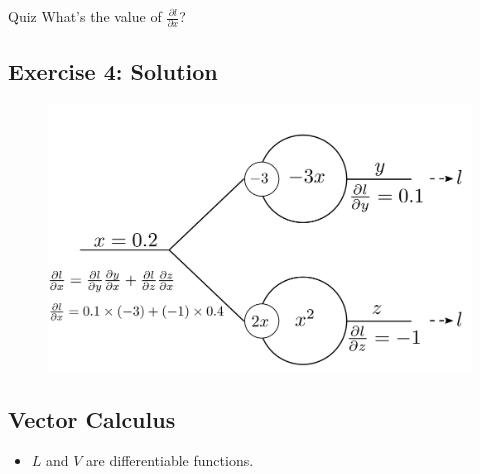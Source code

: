 \documentclass{book}
\begin{document}
\begin{myblock}{Quiz}
What's the value of $\frac{\partial l}{\partial x}$?
\end{myblock}

\subsection{Exercise 4: Solution}

\begin{figure}[h]
    \centering
    \includegraphics[width=\textwidth]{bp_split_sol.png}
\end{figure}

\subsection{Vector Calculus}

\begin{itemize}
\item $L$ and $V$ are differentiable functions.
\end{itemize}
\end{document}
